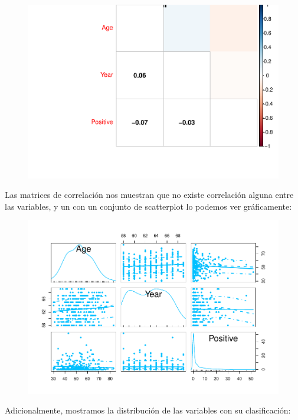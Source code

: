 \begin{figure}[H]\includegraphics[width=.9\linewidth]{img/EDA2_files/figure-latex/unnamed-chunk-27-2} \end{figure}

\newpage

Las matrices de correlación nos muestran que no existe correlación alguna entre las variables, y un con un conjunto de scatterplot lo podemos ver gráficamente:

\begin{figure}[H]\includegraphics[width=.9\linewidth]{img/EDA2_files/figure-latex/unnamed-chunk-28-1} \end{figure}


Adicionalmente, mostramos la distribución de las variables con su clasificación:

